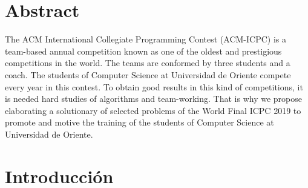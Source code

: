 \documentclass{report}
\begin{document}
\chapter*{Abstract}
The ACM International Collegiate Programming Contest (ACM-ICPC) is a team-based annual competition known as one of the oldest and prestigious competitions in the world. The teams are conformed by three students and a coach. The students of Computer Science at Universidad de Oriente compete every year in this contest. To obtain good results in this kind of competitions, it is needed hard studies of algorithms and team-working. That is why we propose elaborating a solutionary of selected problems of the World Final ICPC 2019 to promote and motive the training of the students of Computer Science at Universidad de Oriente.

\tableofcontents 

\chapter*{Introducci\'on}
\end{document}
